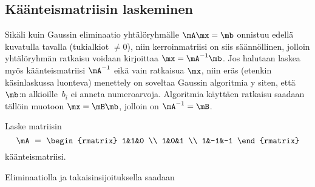 \subsection*{Käänteismatriisin laskeminen}

Sikäli kuin Gaussin eliminaatio yhtälöryhmälle $\mA \mx = \mb$ onnistuu edellä kuvatulla tavalla
(tukialkiot $\neq 0$), niin kerroinmatriisi on siis säännöllinen, jolloin yhtälöryhmän ratkaisu
voidaan kirjoittaa $\mx=\mA^{-1}\mb$. Jos halutaan laskea myös käänteismatriisi $\mA^{-1}$
eikä vain ratkaisua $\mx$, niin eräs (etenkin käsinlaskussa luonteva) menettely on soveltaa
Gaussin algoritmia y siten, että $\mb$:n alkioille $\,b_i$ ei anneta
numeroarvoja. Algoritmia käyttäen ratkaisu saadaan tällöin muotoon $\mx = \mB \mb$, jolloin 
on $\mA^{-1}=\mB$.
\begin{Exa} Laske matriisin
\[ 
\mA\ =\ \begin{rmatrix} 1&1&0 \\ 1&0&1 \\ 1&-1&-1 \end{rmatrix} 
\]
käänteismatriisi. 
\end{Exa}
\ratk Eliminaatiolla ja takaisinsijoituksella saadaan
